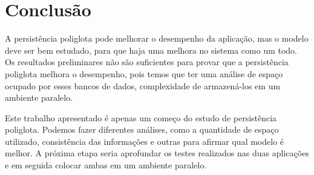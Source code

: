\chapter{Conclusão}
\label{chap:conclusao}

A persistência poliglota pode melhorar o desempenho da aplicação, mas o modelo deve ser bem estudado, para que haja uma melhora no sistema como um todo. Os resultados preliminares não são suficientes para provar que a persistência poliglota melhora o desempenho, pois temos que ter uma análise de espaço ocupado por esses bancos de dados, complexidade de armazená-los em um ambiente paralelo.

Este trabalho apresentado é apenas um começo do estudo de persistência poliglota. Podemos fazer diferentes análises, como a quantidade de espaço utilizado, consistência das informações e outras para afirmar qual modelo é melhor. A próxima etapa seria aprofundar os testes realizados nas duas aplicações e em seguida colocar ambas em um ambiente paralelo.


